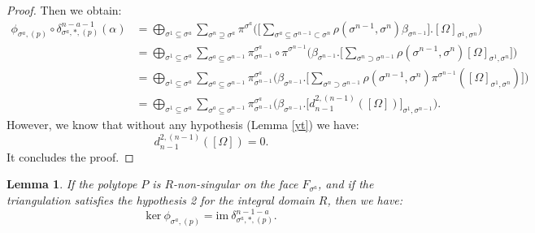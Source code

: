 \documentclass{article}
\newtheorem{lemma}{Lemma}
\begin{document}
\begin{proof}
    Then we obtain:
    \begin{align*}
       \phi_{\sigma^a,(p)} \circ \delta_{\sigma^a,*,(p)}^{n-a-1}(\alpha) &= \bigoplus_{\sigma^1 \subseteq \sigma^a} \sum_{\sigma^n \supseteq \sigma^a}\pi^{\sigma^a}\Bigg( \Bigg[ \sum_{\sigma^a \subseteq \sigma^{n-1} \subset \sigma^{n}} \rho(\sigma^{n-1},\sigma^{n}) \beta_{\sigma^{n-1}} \Bigg].[\Omega]_{\sigma^1,\sigma^n} \Bigg) \\
       & =\bigoplus_{\sigma^1 \subseteq \sigma^a} \sum_{\sigma^a \subseteq \sigma^{n-1} } \pi^{\sigma^a}_{\sigma^{n-1}} \circ \pi^{\sigma^{n-1}} \Bigg( \beta_{\sigma^{n-1}}.\Bigg[ \sum_{\sigma^n\supset \sigma^{n-1}} \rho(\sigma^{n-1},\sigma^n)[\Omega]_{\sigma^1,\sigma^n} \Bigg] \Bigg) \\
       &= \bigoplus_{\sigma^1 \subseteq \sigma^a} \sum_{\sigma^a \subseteq \sigma^{n-1}} \pi^{\sigma^a}_{\sigma^{n-1}} \Bigg( \beta_{\sigma^{n-1}}.\Bigg[ \sum_{\sigma^n\supset \sigma^{n-1}} \rho(\sigma^{n-1},\sigma^n)\pi^{\sigma^{n-1}}([\Omega]_{\sigma^1,\sigma^n}) \Bigg] \Bigg) \\
       & = \bigoplus_{\sigma^1 \subseteq \sigma^a} \sum_{\sigma^a \subseteq \sigma^{n-1}} \pi^{\sigma^a}_{\sigma^{n-1}} \Bigg( \beta_{\sigma^{n-1}}.\Bigg[ d^{2,(n-1)}_{n-1}([\Omega]) \Bigg]_{\sigma^1,\sigma^{n-1}} \Bigg).
    \end{align*}
    However, we know that without any hypothesis (Lemma \ref{yt}) we have:
    \begin{equation*}
        d^{2,(n-1)}_{n-1}([\Omega]) = 0.
    \end{equation*}
    It concludes the proof.
\end{proof}

\begin{lemma}
    If the polytope $P$ is $R$-non-singular on the face $F_{\sigma^a}$, and if the triangulation satisfies the hypothesis 2 for the integral domain $R$, then we have:
    \begin{equation*}
        \mathrm{ker} ~ \phi_{\sigma^a,(p)} = \mathrm{im}~ \delta^{n-1-a}_{\sigma^a,*,(p)}.
    \end{equation*}
\end{lemma}
\end{document}
